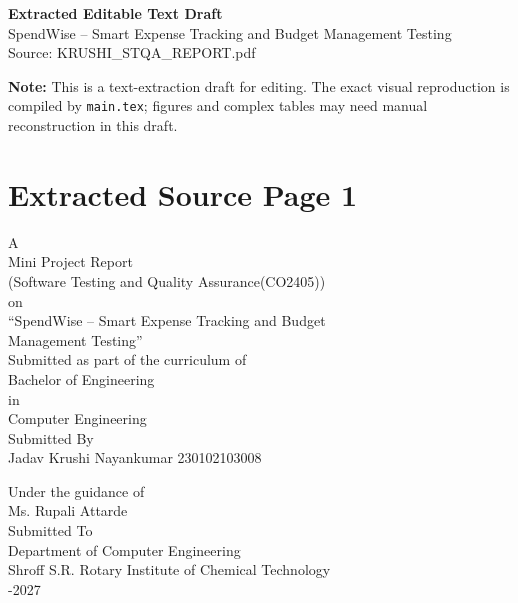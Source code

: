 \documentclass[12pt,a4paper]{report}
\begin{document}
\begin{center}
{\Large\bfseries Extracted Editable Text Draft}\\
{\small SpendWise -- Smart Expense Tracking and Budget Management Testing}\\
{\small Source: KRUSHI\_STQA\_REPORT.pdf}
\end{center}
\textbf{Note:} This is a text-extraction draft for editing. The exact visual reproduction is compiled by \texttt{main.tex}; figures and complex tables may need manual reconstruction in this draft.
\clearpage
\section*{Extracted Source Page 1}
A\\ 
Mini Project Report\\ 
(Software Testing and Quality Assurance(CO2405))\\ 

\smallskip
on\\ 
“SpendWise – Smart Expense Tracking and Budget\\ 
Management Testing”\\ 

\smallskip
Submitted as part of the curriculum of\\ 

\smallskip
Bachelor of Engineering\\ 
in\\ 

\smallskip
Computer Engineering\\ 
Submitted By\\ 

\smallskip
Jadav Krushi Nayankumar            230102103008\\ 

\smallskip

\smallskip
Under the guidance of\\ 

\smallskip
Ms. Rupali Attarde\\ 

\smallskip
Submitted To\\ 

\smallskip
Department of Computer Engineering\\ 

\smallskip
Shroff S.R. Rotary Institute of Chemical Technology\\ 

-2027\\ 
\end{document}

